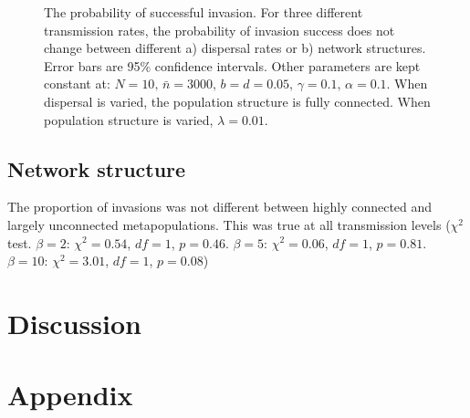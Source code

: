 \begin{figure}[b]
\caption[Invasion probability]{The probability of successful invasion. For three different transmission rates, the probability of invasion success does not change between different a) dispersal rates or b) network structures. Error bars are 95\% confidence intervals. Other parameters are kept constant at: $N = 10,\, \bar{n} = 3000,\, b = d = 0.05,\, \gamma = 0.1,\, \alpha = 0.1$. When dispersal is varied, the population structure is fully connected. When population structure is varied, $\lambda = 0.01$.}
\label{f:dist}
\end{figure}


\subsection{Network structure}

The proportion of invasions was not different between highly connected and largely unconnected metapopulations. This was true at all transmission levels ($\chi^2$ test. $\beta = 2$: $\chi^2 = 0.54$, $df = 1$, $p = 0.46$. $\beta = 5$: $\chi^2 = 0.06$, $df = 1$, $p = 0.81$. $\beta = 10$: $\chi^2 = 3.01$, $df = 1$, $p = 0.08$)

 





\clearpage
\section{Discussion}






\clearpage
\section{Appendix}


